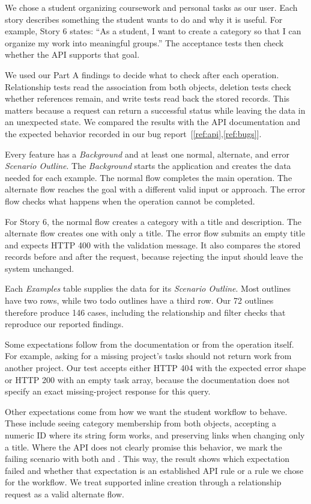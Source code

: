 We chose a student organizing coursework and personal tasks as our user. Each
story describes something the student wants to do and why it is useful. For
example, Story 6 states: ``As a student, I want to create a category so that I can
organize my work into meaningful groups.'' The acceptance tests then check
whether the API supports that goal.

We used our Part A findings to decide what to check after each operation.
Relationship tests read the association from both objects, deletion tests check
whether references remain, and write tests read back the stored records. This
matters because a request can return a successful status while leaving the data
in an unexpected state. We compared the results with the API documentation and
the expected behavior recorded in our bug report~[\ref{ref:api},\ref{ref:bugs}].

Every feature has a \textit{Background} and at least one normal, alternate, and error
\textit{Scenario Outline}. The \textit{Background} starts the application and creates the data
needed for each example. The normal flow completes the main operation. The
alternate flow reaches the goal with a different valid input or approach. The
error flow checks what happens when the operation cannot be completed.

For Story 6, the normal flow creates a category with a title and description.
The alternate flow creates one with only a title. The error flow submits an empty
title and expects HTTP 400 with the validation message. It also compares the
stored records before and after the request, because rejecting the input should
leave the system unchanged.

Each \textit{Examples} table supplies the data for its \textit{Scenario Outline}. Most outlines
have two rows, while two todo outlines have a third row. Our 72 outlines therefore
produce 146 cases, including the relationship and filter checks that reproduce
our reported findings.

Some expectations follow from the documentation or from the operation itself.
For example, asking for a missing project's tasks should not return work from
another project. Our test accepts either HTTP 404 with the expected error shape
or HTTP 200 with an empty task array, because the documentation does not specify
an exact missing-project response for this query.

Other expectations come from how we want the student workflow to behave. These
include seeing category membership from both objects, accepting a numeric ID
where its string form works, and preserving links when changing only a title.
Where the API does not clearly promise this behavior, we mark the failing
scenario with both  and . This way, the result shows
which expectation failed and whether that expectation is an established API rule
or a rule we chose for the workflow. We treat supported inline creation through
a relationship request as a valid alternate flow.
